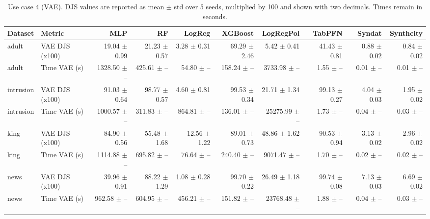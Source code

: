 \begin{table}[ht]
\centering
\scriptsize
\setlength{\tabcolsep}{2.5pt}
\caption{Use case 4 (VAE). DJS values are reported as mean $\pm$ std over 5 seeds, multiplied by 100 and shown with two decimals. Times remain in seconds.}
\label{tab:uc4_vae_by_classifier_mean_std_x100_2dec}
\begin{tabular}{llrrrrrrrr}
\toprule
Dataset & Metric & MLP & RF & LogReg & XGBoost & LogRegPol & TabPFN & Syndat & Synthcity \\
\midrule
adult & VAE DJS (x100) & 19.04 $\pm$ 0.99 & 21.23 $\pm$ 0.57 & 3.28 $\pm$ 0.31 & 69.29 $\pm$ 2.46 & 5.42 $\pm$ 0.41 & 41.43 $\pm$ 0.81 & 0.88 $\pm$ 0.02 & 0.84 $\pm$ 0.02 \\
adult & Time VAE (s) & 1328.50 $\pm$ -- & 425.61 $\pm$ -- & 54.80 $\pm$ -- & 158.24 $\pm$ -- & 3733.98 $\pm$ -- & 1.55 $\pm$ -- & 0.01 $\pm$ -- & 0.01 $\pm$ -- \\
intrusion & VAE DJS (x100) & 91.03 $\pm$ 0.64 & 98.77 $\pm$ 0.57 & 4.60 $\pm$ 0.81 & 99.53 $\pm$ 0.34 & 21.71 $\pm$ 1.34 & 99.13 $\pm$ 0.27 & 4.04 $\pm$ 0.03 & 1.95 $\pm$ 0.02 \\
intrusion & Time VAE (s) & 1000.57 $\pm$ -- & 311.83 $\pm$ -- & 864.81 $\pm$ -- & 136.01 $\pm$ -- & 25275.99 $\pm$ -- & 1.73 $\pm$ -- & 0.04 $\pm$ -- & 0.03 $\pm$ -- \\
king & VAE DJS (x100) & 84.90 $\pm$ 0.56 & 55.48 $\pm$ 1.68 & 12.56 $\pm$ 1.22 & 89.01 $\pm$ 0.73 & 48.86 $\pm$ 1.62 & 90.53 $\pm$ 0.94 & 3.13 $\pm$ 0.02 & 2.96 $\pm$ 0.02 \\
king & Time VAE (s) & 1114.88 $\pm$ -- & 695.82 $\pm$ -- & 76.64 $\pm$ -- & 240.40 $\pm$ -- & 9071.47 $\pm$ -- & 1.70 $\pm$ -- & 0.02 $\pm$ -- & 0.02 $\pm$ -- \\
news & VAE DJS (x100) & 39.96 $\pm$ 0.91 & 88.22 $\pm$ 1.29 & 1.08 $\pm$ 0.28 & 99.70 $\pm$ 0.22 & 26.49 $\pm$ 1.18 & 99.74 $\pm$ 0.08 & 7.13 $\pm$ 0.03 & 6.69 $\pm$ 0.02 \\
news & Time VAE (s) & 962.58 $\pm$ -- & 604.95 $\pm$ -- & 456.21 $\pm$ -- & 151.82 $\pm$ -- & 23768.48 $\pm$ -- & 1.88 $\pm$ -- & 0.04 $\pm$ -- & 0.03 $\pm$ -- \\
\bottomrule
\end{tabular}
\end{table}